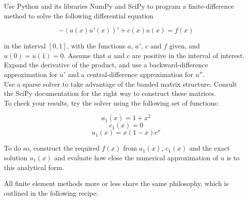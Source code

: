\begin{exer}
Use Python and its libraries NumPy and SciPy to program a finite-difference method to solve the following differential equation

$$ -\left(a(x) u'(x) \right)' + c(x)u(x) = f(x)$$

in the interval $[0,1]$, with the functions $a$, $a'$, $c$ and $f$ given, and $u(0) = u(1) = 0$. Assume that $a$ and $c$ are positive in the interval of interest.\\

Expand the derivative of the product, and use a backward-difference approximation for $u'$ and a central-difference approximation for $u''$. \\

Use a sparse solver to take advantage of the banded matrix structure. Consult the SciPy documentation for the right way to construct these matrices. \\

To check your results, try the solver using the following set of functions:

$$a_1(x) = 1 + x^2$$
$$c_1(x) = 0$$
$$u_1(x) = x(1-x) e^x $$

To do so, construct the required $f(x)$ from $a_1(x)$, $c_1(x)$ and the exact solution $u_1(x)$ and evaluate how close the numerical approximation of $u$ is to this analytical form.

\end{exer}



\pagebreak



All finite element methods more or less share the same philosophy, which is outlined in the following recipe:

